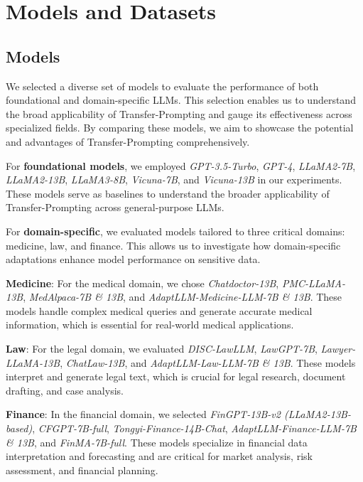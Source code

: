 \section{Models and Datasets}
\label{sec:appendix}

\subsection{Models}
\label{sec:appendix_models}
We selected a diverse set of models to evaluate the performance of both foundational and domain-specific LLMs. This selection enables us to understand the broad applicability of Transfer-Prompting and gauge its effectiveness across specialized fields. By comparing these models, we aim to showcase the potential and advantages of Transfer-Prompting comprehensively.

For \textbf{foundational models}, we employed
\textit{GPT-3.5-Turbo}, \textit{GPT-4}, \textit{LLaMA2-7B}, \textit{LLaMA2-13B}, \textit{LLaMA3-8B}, \textit{Vicuna-7B}, and \textit{Vicuna-13B} in our experiments. These models serve as baselines to understand the broader applicability of Transfer-Prompting across general-purpose LLMs.

For \textbf{domain-specific}, we evaluated models tailored to three critical domains: medicine, law, and finance. This allows us to investigate how domain-specific adaptations enhance model performance on sensitive data.

\textbf{Medicine}:
For the medical domain, we chose \textit{Chatdoctor-13B}, \textit{PMC-LLaMA-13B}, \textit{MedAlpaca-7B \& 13B}, and \textit{AdaptLLM-Medicine-LLM-7B \& 13B}. These models handle complex medical queries and generate accurate medical information, which is essential for real-world medical applications.

\textbf{Law}:
For the legal domain, we evaluated \textit{DISC-LawLLM}, \textit{LawGPT-7B}, \textit{Lawyer-LLaMA-13B}, \textit{ChatLaw-13B}, and \textit{AdaptLLM-Law-LLM-7B \& 13B}. These models interpret and generate legal text, which is crucial for legal research, document drafting, and case analysis.

\textbf{Finance}:
In the financial domain, we selected \textit{FinGPT-13B-v2 (LLaMA2-13B-based)}, \textit{CFGPT-7B-full}, \textit{Tongyi-Finance-14B-Chat}, \textit{AdaptLLM-Finance-LLM-7B \& 13B}, and \textit{FinMA-7B-full}. These models specialize in financial data interpretation and forecasting and are critical for market analysis, risk assessment, and financial planning. 

